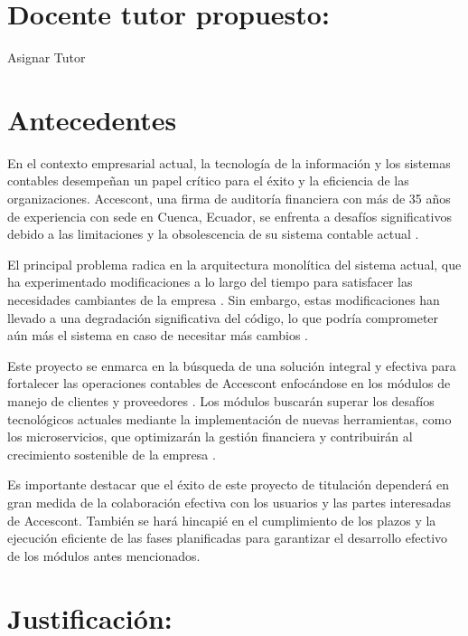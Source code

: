 \documentclass{article}
\begin{document}
\section{Docente tutor propuesto:   }
\begin{center}
Asignar Tutor
\end{center}
\section{Antecedentes}

En el contexto empresarial actual, la tecnología de la información y los sistemas contables desempeñan un papel crítico para el éxito y la eficiencia de las organizaciones. Accescont, una firma de auditoría financiera con más de 35 años de experiencia con sede en Cuenca, Ecuador, se enfrenta a desafíos significativos debido a las limitaciones y la obsolescencia de su sistema contable actual \cite{CatacoraSI}.

El principal problema radica en la arquitectura monolítica del sistema actual, que ha experimentado modificaciones a lo largo del tiempo para satisfacer las necesidades cambiantes de la empresa \cite{HallSIC}. Sin embargo, estas modificaciones han llevado a una degradación significativa del código, lo que podría comprometer aún más el sistema en caso de necesitar más cambios \cite{HorngrenCC}.

Este proyecto se enmarca en la búsqueda de una solución integral y efectiva para fortalecer las operaciones contables de Accescont enfocándose en los módulos de manejo de clientes y proveedores \cite{GuajardoCF}. Los módulos buscarán superar los desafíos tecnológicos actuales mediante la implementación de nuevas herramientas, como los microservicios, que optimizarán la gestión financiera y contribuirán al crecimiento sostenible de la empresa \cite{WarrenRF}.

Es importante destacar que el éxito de este proyecto de titulación dependerá en gran medida de la colaboración efectiva con los usuarios y las partes interesadas de Accescont. También se hará hincapié en el cumplimiento de los plazos y la ejecución eficiente de las fases planificadas para garantizar el desarrollo efectivo de los módulos antes mencionados.


       
 \section{Justificación:}
\end{document}
